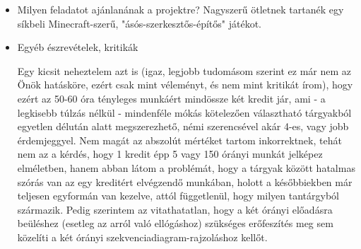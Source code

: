 \begin{itemize}
\item Milyen feladatot ajánlanának a projektre? \newline
Nagyszerű ötletnek tartanék egy síkbeli Minecraft-szerű, "ásós-szerkesztős-építős" játékot.

\item Egyéb észrevételek, kritikák

Egy kicsit neheztelem azt is (igaz, legjobb tudomásom szerint ez már nem az Önök hatásköre, ezért csak mint véleményt, és nem mint kritikát írom), hogy ezért az 50-60 óra tényleges munkáért mindössze két kredit jár, ami - a legkisebb túlzás nélkül - mindenféle mókás kötelezően választható tárgyakból egyetlen délután alatt megszerezhető, némi szerencsével akár 4-es, vagy jobb érdemjeggyel. Nem magát az abszolút mértéket tartom inkorrektnek, tehát nem az a kérdés, hogy 1 kredit épp 5 vagy 150 órányi munkát jelképez elméletben, hanem abban látom a problémát, hogy a tárgyak között hatalmas szórás van az egy kreditért elvégzendő munkában, holott a későbbiekben már teljesen egyformán van kezelve, attól függetlenül, hogy milyen tantárgyból származik. Pedig szerintem az vitathatatlan, hogy a két órányi előadásra beüléshez (esetleg az arról való ellógáshoz) szükséges erőfeszítés meg sem közelíti a két órányi szekvenciadiagram-rajzoláshoz kellőt.

\end{itemize}


